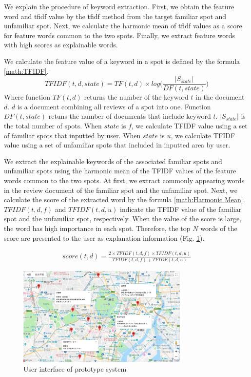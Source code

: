 \documentclass[journal]{IAENGtran}
\begin{document}
We explain the procedure of keyword extraction. First, we obtain the feature word and tfidf value by the tfidf method from the target familiar spot and unfamiliar spot. Next, we calculate the harmonic mean of tfidf values as a score for feature words common to the two spots. Finally, we extract feature words with high scores as explainable words.

We calculate the feature value of a keyword in a spot is defined by the formula \ref{math:TFIDF}.
\begin{equation}
  TFIDF(t,d,state) = TF(t,d) \times log\Biggr(\frac{|S_{state}|}{DF(t,state)}\Biggr)
  \label{math:TFIDF}
\end{equation}
Where function $TF(t,d)$ returns the number of the keyword $t$ in the document $d$.
$d$ is a document combining all reviews of a spot into one.
Function $DF(t,state)$ retuns the number of documents that include keyword $t$.
$|S_{state}|$ is the total number of spots.
When $state$ is $f$, we calculate TFIDF value using a set of familiar spots that inputted by user.
When $state$ is $u$, we calculate TFIDF value using a set of unfamiliar spots that included in inputted area by user.

We extract the explainable keywords of the associated familiar spots and unfamiliar spots using the harmonic mean of the TFIDF values of the feature words common to the two spots.
At first, we extract commonly appearing words in the review document of the familiar spot and the unfamiliar spot.
Next, we calculate the score of the extracted word by the formula \ref{math:Harmonic Mean}.
$TFIDF(t,d,f)$ and $TFIDF(t,d,u)$ indicate the TFIDF value of the familiar spot and the unfamiliar spot, respectively.
When the value of the score is large, the word has high importance in each spot.
Therefore, the top $N$ words of the score are presented to the user as explanation information (Fig. \ref{fig:Photo_Map}).

\begin{eqnarray}
  score(t,d) = \frac{2 \times TFIDF(t,d,f) \times TFIDF(t,d,u)}{TFIDF(t,d,f) + TFIDF(t,d,u)}
  \label{math:Harmonic Mean}
\end{eqnarray}

\begin{figure}[t]
  \begin{center}
    \includegraphics[clip,width=8.5cm,bb=0 0 1289 750]{picture/Photo_Map.png}
    \caption{User interface of prototype system}
    \label{fig:Photo_Map}
   \end{center}
\end{figure}
\end{document}

